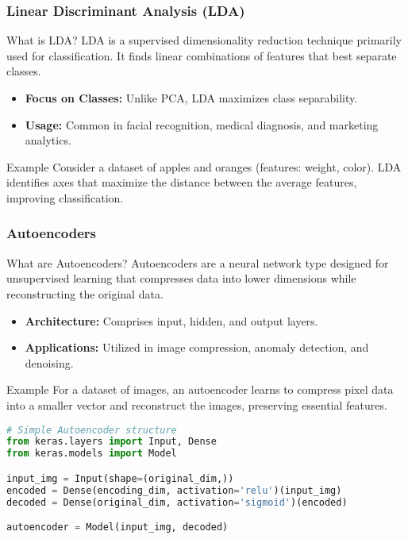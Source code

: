 \documentclass[aspectratio=169]{beamer}
\begin{document}
\begin{frame}
    \frametitle{Linear Discriminant Analysis (LDA)}
    \begin{block}{What is LDA?}
        LDA is a supervised dimensionality reduction technique primarily used for classification. It finds linear combinations of features that best separate classes.
    \end{block}
    
    \begin{itemize}
        \item \textbf{Focus on Classes:} Unlike PCA, LDA maximizes class separability.
        \item \textbf{Usage:} Common in facial recognition, medical diagnosis, and marketing analytics.
    \end{itemize}

    \begin{block}{Example}
        Consider a dataset of apples and oranges (features: weight, color). LDA identifies axes that maximize the distance between the average features, improving classification.
    \end{block}
\end{frame}

\begin{frame}
    \frametitle{Autoencoders}
    \begin{block}{What are Autoencoders?}
        Autoencoders are a neural network type designed for unsupervised learning that compresses data into lower dimensions while reconstructing the original data.
    \end{block}

    \begin{itemize}
        \item \textbf{Architecture:} Comprises input, hidden, and output layers.
        \item \textbf{Applications:} Utilized in image compression, anomaly detection, and denoising.
    \end{itemize}

    \begin{block}{Example}
        For a dataset of images, an autoencoder learns to compress pixel data into a smaller vector and reconstruct the images, preserving essential features.
    \end{block}
    
    \begin{lstlisting}[language=Python, caption=Simple Autoencoder structure]
# Simple Autoencoder structure
from keras.layers import Input, Dense
from keras.models import Model

input_img = Input(shape=(original_dim,))
encoded = Dense(encoding_dim, activation='relu')(input_img)
decoded = Dense(original_dim, activation='sigmoid')(encoded)

autoencoder = Model(input_img, decoded)
    \end{lstlisting}
\end{frame}
\end{document}
